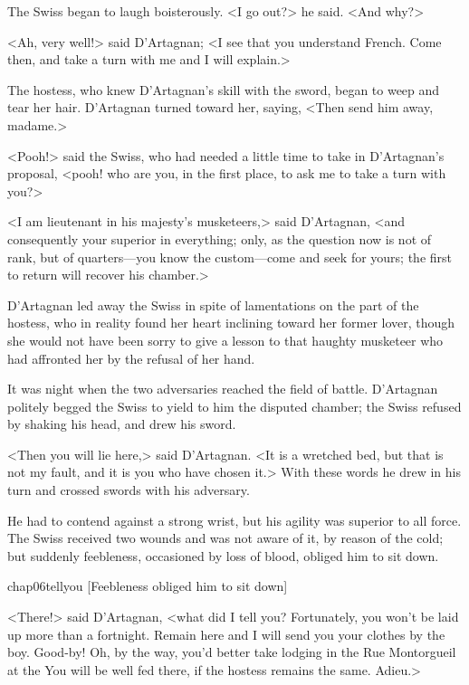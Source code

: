 The Swiss began to laugh boisterously. <I go out?> he said. <And why?>

<Ah, very well!> said D'Artagnan; <I see that you understand French. Come then, and take a turn with me and I will explain.>

The hostess, who knew D'Artagnan's skill with the sword, began to weep and tear her hair. D'Artagnan turned toward her, saying, <Then send him away, madame.>

<Pooh!> said the Swiss, who had needed a little time to take in D'Artagnan's proposal, <pooh! who are you, in the first place, to ask me to take a turn with you?>

<I am lieutenant in his majesty's musketeers,> said D'Artagnan, <and consequently your superior in everything; only, as the question now is not of rank, but of quarters—you know the custom—come and seek for yours; the first to return will recover his chamber.>

D'Artagnan led away the Swiss in spite of lamentations on the part of the hostess, who in reality found her heart inclining toward her former lover, though she would not have been sorry to give a lesson to that haughty musketeer who had affronted her by the refusal of her hand.

It was night when the two adversaries reached the field of battle. D'Artagnan politely begged the Swiss to yield to him the disputed chamber; the Swiss refused by shaking his head, and drew his sword.

<Then you will lie here,> said D'Artagnan. <It is a wretched bed, but that is not my fault, and it is you who have chosen it.> With these words he drew in his turn and crossed swords with his adversary.

He had to contend against a strong wrist, but his agility was superior to all force. The Swiss received two wounds and was not aware of it, by reason of the cold; but suddenly feebleness, occasioned by loss of blood, obliged him to sit down.

\begin{bwbigpic}
	[\basicscale] 
	{chap06tellyou}
	[Feebleness obliged him to sit down]
\end{bwbigpic}

<There!> said D'Artagnan, <what did I tell you? Fortunately, you won't be laid up more than a fortnight. Remain here and I will send you your clothes by the boy. Good-by! Oh, by the way, you'd better take lodging in the Rue Montorgueil at the  You will be well fed there, if the hostess remains the same. Adieu.>

